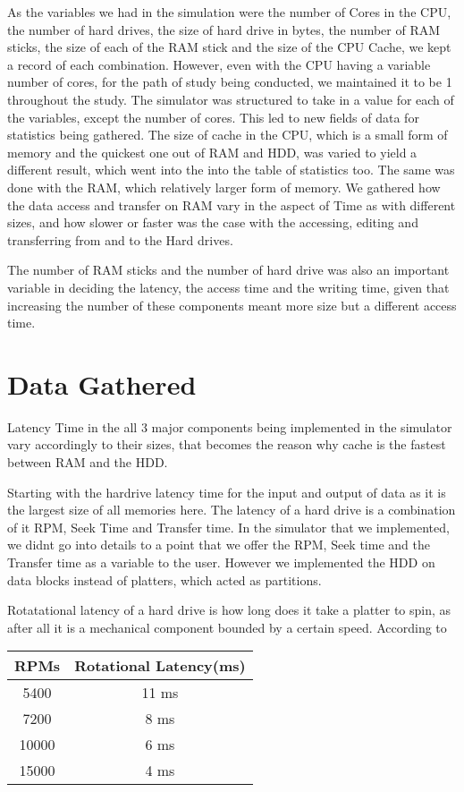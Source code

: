 \documentclass[12pt]{article}
\begin{document}
As the variables we had in the simulation were the number of Cores in the CPU,
the number of hard drives, the size of hard drive in bytes, the number of RAM sticks, the size of
each of the RAM stick and the size of the CPU Cache, we kept a record of each combination. However,
even with the CPU having a variable number of cores, for the path of study being conducted, we maintained
it to be 1 throughout the study. The simulator was structured to take in a value for each of the variables,
except the number of cores. This led to new fields of data for statistics being gathered.
The size of cache in the CPU, which is a small form of memory and the quickest one out of RAM and HDD, was
varied to yield a different result, which went into the into the table of statistics too.
The same was done with the RAM, which relatively larger form of memory. We gathered how the data access
and transfer on RAM vary in the aspect of Time as with different sizes, and how slower or faster was the case
with the accessing, editing and transferring from and to the Hard drives.

The number of RAM sticks and the number of hard drive was also an important variable in deciding the latency,
the access time and the writing time, given that increasing the number of these components meant more
size but a different access time.

\section{Data Gathered}
\label{sec:data}

Latency Time in the all 3 major components being implemented in the simulator vary accordingly to their sizes,
that becomes the reason why cache is the fastest between RAM and the HDD.

Starting with the hardrive latency time for the input and output of data as it is the largest size of all memories here.
The latency of a hard drive is a combination of it RPM, Seek Time and Transfer time. In the simulator that we
implemented, we didnt go into details to a point that we offer the RPM, Seek time and the Transfer time as
a variable to the user. However we implemented the HDD on data blocks instead of platters, which acted as
partitions. 

Rotatational latency of a hard drive is how long does it take a platter to spin, as after all it is a mechanical
component bounded by a certain speed.
According to \cite{diskLatency} 

\begin{tabular}{|c|c|}
  \hline
  RPMs & Rotational Latency(ms)\\
  \hline
  5400 & 11 ms\\
  \hline
  7200 & 8 ms\\
  \hline
  10000 & 6 ms\\
  \hline
  15000 & 4 ms\\
  \hline
\end {tabular}
\end{document}
